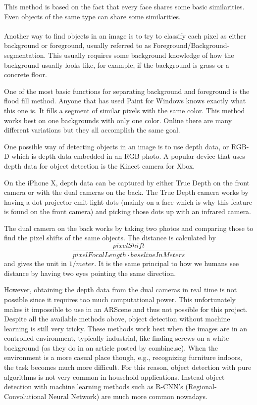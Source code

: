 This method is based on the fact that every face shares some basic similarities. Even objects of the same type can share some similarities.
\\\\
Another way to find objects in an image is to try to classify each pixel as either background or foreground, usually referred to as Foreground/Background-segmentation. This usually requires some background knowledge of how the background usually looks like, for example, if the background is grass or a concrete floor.

One of the most basic functions for separating background and foreground is the flood fill method.
Anyone that has used Paint for Windows knows exactly what this one is. It fills a segment of similar pixels with the same color. This method works best on one backgrounds with only one color.
Online there are many different variations but they all accomplish the same goal.\cite{floodFill}

One possible way of detecting objects in an image is to use depth data, or RGB-D which is depth data embedded in an RGB photo.
A popular device that uses depth data for object detection is the Kinect camera
for Xbox.

On the iPhone X, depth data can be captured by either True Depth on the front camera or with the dual cameras on the back. The True Depth camera works by having a dot projector emit light dots (mainly on a face which is why this feature is found on the front camera) and picking those dots up with an infrared camera.

The dual camera on the back works by taking two photos and comparing those to find the pixel shifts of the same objects. The distance is calculated by \[ \frac{pixelShift} { pixelFocalLength \cdot baselineInMeters}\] and gives the unit in $1/meter$. It is the same principal to how we humans see distance by having two eyes pointing the same direction. \cite{depthMap}

However, obtaining the depth data from the dual cameras in real time is not possible since it requires too much computational power. This unfortunately makes it impossible to use in an ARScene and thus not possible for this project.\\

Despite all the available methods above, object detection without machine learning is still very tricky. These methods work best when the images are in an controlled environment, typically industrial, like finding screws on a white background (as they do in an article posted by combine.se). \cite{combine}
When the environment is a more casual place though, e.g., recognizing furniture indoors, the task becomes much more difficult. For this reason, object detection with pure algorithms is not very common in household applications. Instead object detection with machine learning methods such as R-CNN's (Regional-Convolutional Neural Network) are much more common nowadays.


